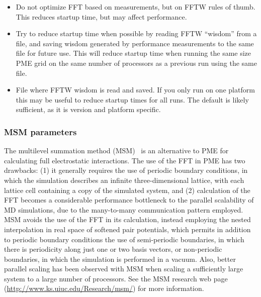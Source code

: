 \begin{itemize}
\item
{}
{Do not optimize FFT based on measurements, but on FFTW rules of thumb.
This reduces startup time, but may affect performance.}

\item
{}
{Try to reduce startup time when possible by reading FFTW ``wisdom'' from a file, and saving wisdom generated by performance measurements to the same file for future use.
This will reduce startup time when running the same size PME grid on the same number of processors as a previous run using the same file.}

\item
{}
{File where FFTW wisdom is read and saved.
If you only run on one platform this may be useful to reduce startup times for all runs.
The default is likely sufficient, as it is version and platform specific.}

\end{itemize}


\subsubsection{MSM parameters}

The multilevel summation method (MSM)~\cite{HARD2015}
is an alternative to PME for calculating full electrostatic interactions.
The use of the FFT in PME has two drawbacks:
(1) it generally requires the use of periodic boundary conditions, 
in which the simulation describes an infinite three-dimensional lattice,
with each lattice cell containing a copy of the simulated system, and
(2) calculation of the FFT becomes a considerable performance bottleneck
to the parallel scalability of MD simulations, due to the many-to-many
communication pattern employed.
MSM avoids the use of the FFT in its calculation,
instead employing the nested interpolation in real space
of softened pair potentials, 
which permits in addition to periodic boundary conditions 
the use of
semi-periodic boundaries, in which there is periodicity along 
just one or two basis vectors, 
or non-periodic boundaries, in which the simulation is 
performed in a vacuum. 
Also, better parallel scaling has been observed with MSM 
when scaling a sufficiently large system to a large number of processors. 
See the MSM research web page (\url{http://www.ks.uiuc.edu/Research/msm/}) 
for more information. 

